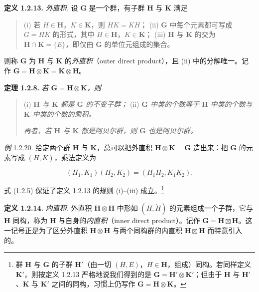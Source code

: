 \textbf{定义 1.2.13.} \textit{外直积.} 设 $\mathbf{G}$ 是一个群，有子群 $\mathbf{H}$ 与 $\mathbf{K}$ 满足

\begin{quote}
(i) 若 $H \in \mathbf{H}$，$K \in \mathbf{K}$，则 $HK = KH$；
(ii) $\mathbf{G}$ 中每个元素都可写成 $G = HK$ 的形式，其中 $H \in \mathbf{H}$，$K \in \mathbf{K}$；
(iii) $\mathbf{H}$ 与 $\mathbf{K}$ 的交为 $\mathbf{H} \cap \mathbf{K} = \{E\}$，即仅由 $\mathbf{G}$ 的单位元组成的集合。
\end{quote}

则称 $\mathbf{G}$ 为 $\mathbf{H}$ 与 $\mathbf{K}$ 的\textit{外直积}（outer direct product），且 (ii) 中的分解唯一。记作 $\mathbf{G} = \mathbf{H} \otimes \mathbf{K} = \mathbf{K} \otimes \mathbf{H}$。

\textbf{定理 1.2.8.} \textit{若 $\mathbf{G} = \mathbf{H} \otimes \mathbf{K}$，则}

\begin{quote}
(i) \textit{$\mathbf{H}$ 与 $\mathbf{K}$ 都是 $\mathbf{G}$ 的不变子群；}
(ii) \textit{$\mathbf{G}$ 中类的个数等于 $\mathbf{H}$ 中类的个数与 $\mathbf{K}$ 中类的个数的乘积。}

\textit{再者，若 $\mathbf{H}$ 与 $\mathbf{K}$ 都是阿贝尔群，则 $\mathbf{G}$ 也是阿贝尔群。}
\end{quote}

\textit{例} 1.2.20. 给定两个群 $\mathbf{H}$ 与 $\mathbf{K}$，总可以把外直积 $\mathbf{H} \otimes \mathbf{K} = \mathbf{G}$ 造出来：把 $\mathbf{G}$ 的元素写成 $(H, K)$，乘法定义为

\begin{equation*}
(H_{1}, K_{1})(H_{2}, K_{2}) = (H_{1}H_{2}, K_{1}K_{2}). \tag{1.2.5}
\end{equation*}

式 (1.2.5) 保证了定义 1.2.13 的规则 (i)–(iii) 成立。\footnote{群 $\mathbf{H}$ 与 $\mathbf{G}$ 的子群 $\mathbf{H}'$（由一切 $(H, E)$，$H \in \mathbf{H}$，组成）同构。若同样定义 $\mathbf{K}'$，则按定义 1.2.13 严格地说我们得到的是 $\mathbf{G} = \mathbf{H}' \otimes \mathbf{K}'$；但由于 $\mathbf{H}$ 与 $\mathbf{H}'$、$\mathbf{K}$ 与 $\mathbf{K}'$ 之间的同构，习惯上仍写作 $\mathbf{G} = \mathbf{H} \otimes \mathbf{K}$。}

\textbf{定义 1.2.14.} \textit{内直积.} 外直积 $\mathbf{H} \otimes \mathbf{H}$ 中形如 $(H, \dot{H})$ 的元素组成一个子群，它与 $\mathbf{H}$ 同构，称为 $\mathbf{H}$ 与自身的\textit{内直积}（inner direct product）。记作 $\mathbf{G} = \mathbf{H} \boxtimes \mathbf{H}$。这一记号正是为了区分外直积 $\mathbf{H} \otimes \mathbf{H}$ 与两个同构群的内直积 $\mathbf{H} \boxtimes \mathbf{H}$ 而特意引入的。

